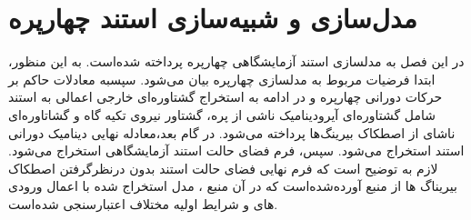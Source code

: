\chapter{مدل‌سازی و شبیه‌سازی استند چهارپره}
 در این فصل به مدلسازی استند آزمایشگاهی چهارپره پرداخته شده‌است. به این منظور، ابتدا فرضیات مربوط به 
 مدلسازی چهارپره بیان می‌شود. سپسبه معادلات حاکم بر حرکات 
 دورانی چهارپره و در ادامه به استخراج گشتاوره‌ای خارجی اعمالی 
 به استند شامل گشتاوره‌ای آیرودینامیک ناشی از پره، گشتاور نیروی تکیه گاه و گشاتاوره‌ای ناشای از 
 اصطکاک بیرینگ‌ها پرداخته می‌شود. در گام بعد،معادله نهایی دینامیک دورانی استند 
 استخراج می‌شود. سپس، فرم فضای حالت استند آزمایشگاهی استخراج می‌شود. لازم به 
 توضیح است که فرم نهایی فضای حالت استند بدون درنظرگرفتن اصطکاک بیریناگ ها از منبع
 \cite{Abeshtan}
 آورده‌شده‌است که در آن منبع ، مدل استخراج شده با اعمال ورودی های و شرایط اولیه مختلاف 
 اعتبارسنجی شده‌است.